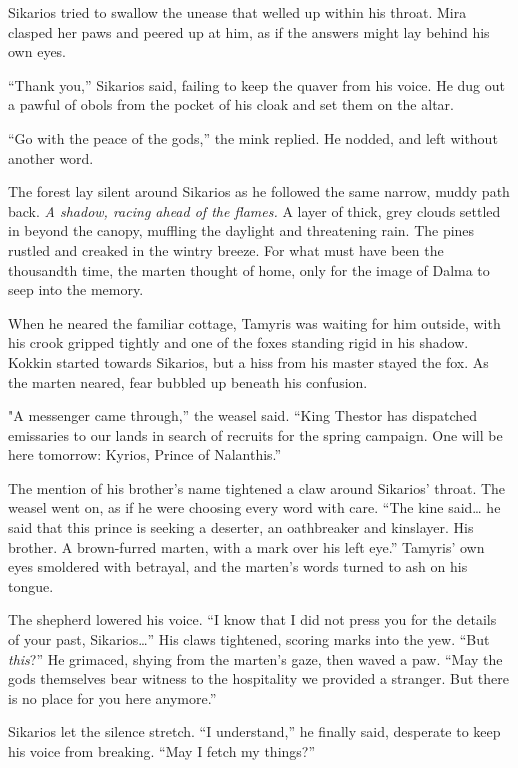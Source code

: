 Sikarios tried to swallow the unease that welled up within his throat. Mira clasped her paws and peered up at him, as if the answers might lay behind his own eyes.

``Thank you,'' Sikarios said, failing to keep the quaver from his voice. He dug out a pawful of obols from the pocket of his cloak and set them on the altar.

``Go with the peace of the gods,'' the mink replied. He nodded, and left without another word.

The forest lay silent around Sikarios as he followed the same narrow, muddy path back. \emph{A shadow, racing ahead of the flames.} A layer of thick, grey clouds settled in beyond the canopy, muffling the daylight and threatening rain. The pines rustled and creaked in the wintry breeze. For what must have been the thousandth time, the marten thought of home, only for the image of Dalma to seep into the memory.

When he neared the familiar cottage, Tamyris was waiting for him outside, with his crook gripped tightly and one of the foxes standing rigid in his shadow. Kokkin started towards Sikarios, but a hiss from his master stayed the fox. As the marten neared, fear bubbled up beneath his confusion.

"A messenger came through,'' the weasel said. ``King Thestor has dispatched emissaries to our lands in search of recruits for the spring campaign. One will be here tomorrow: Kyrios, Prince of Nalanthis.''

The mention of his brother's name tightened a claw around Sikarios' throat. The weasel went on, as if he were choosing every word with care. ``The kine said\ldots{} he said that this prince is seeking a deserter, an oathbreaker and kinslayer. His brother. A brown-furred marten, with a mark over his left eye.'' Tamyris' own eyes smoldered with betrayal, and the marten's words turned to ash on his tongue.

The shepherd lowered his voice. ``I know that I did not press you for the details of your past, Sikarios\ldots'' His claws tightened, scoring marks into the yew. ``But \emph{this}?'' He grimaced, shying from the marten's gaze, then waved a paw. ``May the gods themselves bear witness to the hospitality we provided a stranger. But there is no place for you here anymore.''

Sikarios let the silence stretch. ``I understand,'' he finally said, desperate to keep his voice from breaking. ``May I fetch my things?''

